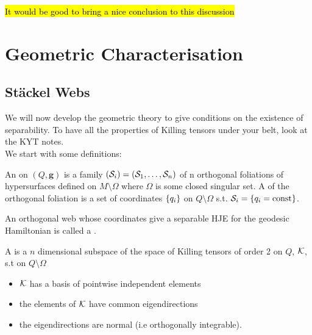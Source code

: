 \documentclass{article}
\begin{document}
\hl{It would be good to bring a nice conclusion to this discussion}

\section{Geometric Characterisation}

\subsection{St\"ackel Webs}

We will now develop the geometric theory to give conditions on the existence of separability. To have all the properties of Killing tensors under your belt, look at the KYT notes. \\
We start with some definitions:

\begin{definition}
An  on $(Q,\bm{g})$ is a family $(\mathcal{S}_i) = (\mathcal{S}_1, \dots, \mathcal{S}_n)$ of n orthogonal foliations of hypersurfaces defined on $M\setminus \Omega$ where $\Omega$ is some closed singular set. A  of the orthogonal foliation is a set of coordinates $\left\{ q_i \right\}$ on $Q\setminus \Omega$ s.t. $\mathcal{S}_i = \left\{ q_i = \text{const} \right\}$.
\end{definition}

\begin{definition}
An orthogonal web whose coordinates give a separable HJE for the geodesic Hamiltonian is called a .
\end{definition}

\begin{definition}
A  is a $n$ dimensional subspace of the space of Killing tensors of order 2 on $Q$, $\mathcal{K}$, s.t on $Q\setminus \Omega$
\begin{itemize}
    \item $\mathcal{K}$ has a basis of pointwise independent elements 
    \item the elements of $\mathcal{K}$ have common eigendirections
    \item the eigendirections are normal (i.e orthogonally integrable).
\end{itemize}
\end{definition}
\end{document}
